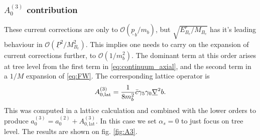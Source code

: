 \subsubsection{$A_0^{(3)}$ contribution}

These current corrections are only to $\mathcal{O}(\underline{p}_b/m_b)$, but $\sqrt{E^r_{B_c}/M_{B_c}}$ has it's leading behaviour in $\mathcal{O}(\underline{P}^2/M_{B_c}^2)$. This implies one needs to carry on the expansion of current corrections further, to $\mathcal{O}(1/m_b^2)$. The dominant term at this order arises at tree level from the first term in \eqref{eq:continuum_axial}, and the second term in a $1/M$ expansion of \eqref{eq:FW}. The corresponding lattice operator is
\begin{align}
	A^{(3)}_{0,\text{lat}} = {1\over 8m_b^2} \bar{c} \gamma_5\gamma_0 \underline{\nabla}^2 b. 
\end{align}
This was computed in a lattice calculation and combined with the lower orders to produce $a^{(3)}_0 = a_0^{(2)} + A^{(3)}_{0,\text{lat}}$. In this case we set $\alpha_s = 0$ to just focus on tree level. The results are shown on fig. \ref{fig:A3}.
